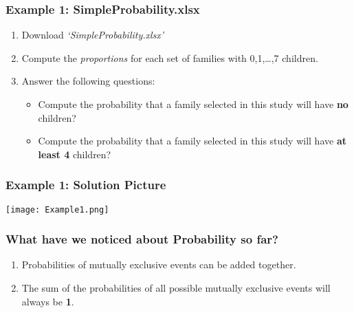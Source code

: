 \documentclass[12pt]{beamer}
\begin{document}
	\begin{frame}
		\frametitle{Example 1: SimpleProbability.xlsx}
		\begin{enumerate}
			\item Download \textit{`SimpleProbability.xlsx'}
			\item Compute the \textit{proportions} for each set of families with 0,1,\ldots,7 children.
			\item Answer the following questions:
			\begin{itemize}
				\item Compute the probability that a family selected in this study will have \textbf{no} children?
				\item Compute the probability that a family selected in this study will have \textbf{at least 4} children?
			\end{itemize}
	\end{enumerate}
	\end{frame}
	\begin{frame}
		\frametitle{Example  1: Solution Picture}
		\begin{center}
			\texttt{[image: Example1.png]}
		\end{center}
	\end{frame}
	\begin{frame}
		\frametitle{What have we noticed about Probability so far?}
		\begin{enumerate}
			\item Probabilities of mutually exclusive events can be added together.
			\item The sum of the probabilities of all possible mutually exclusive events will always be \textbf{1}.
		\end{enumerate}
	\end{frame}
\end{document}
